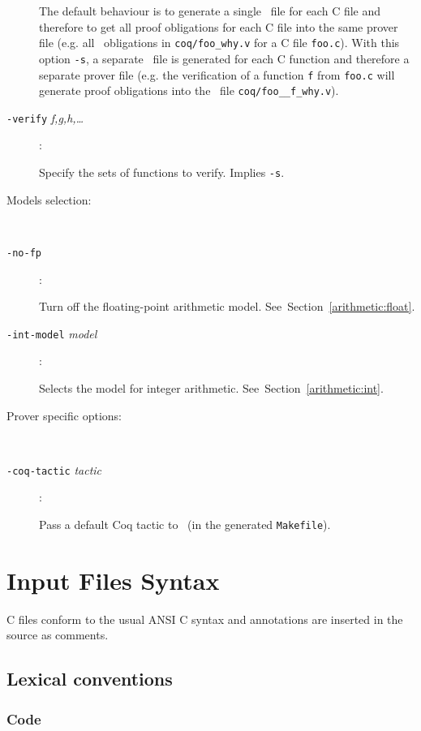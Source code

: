 \documentclass[12pt,a4paper,twoside,openright]{report}
\begin{document}
\begin{description}
    The default behaviour is to generate a single \why\ file 
    for each C file and therefore to get all proof obligations for
    each C file into the same prover file (e.g. all \coq\ obligations
    in \texttt{coq/foo\_why.v} for a C file \texttt{foo.c}).
    With this option \texttt{-s}, a separate \why\ file is generated
    for each C function and therefore a separate prover file
    (e.g. the verification of a function \texttt{f} from
    \texttt{foo.c} will generate proof obligations into the \coq\ file
    \texttt{coq/foo\_\_f\_why.v}).
  \item[\texttt{-verify} \textit{f,g,h,\dots}]: ~\par
    Specify the sets of functions to verify. Implies \texttt{-s}.

  \item[Models selection:] ~\par
  \item[\texttt{-no-fp}]: ~\par
    Turn off the floating-point arithmetic model. 
    See~Section~\ref{arithmetic:float}.

  \item[\texttt{-int-model} \textit{model}]: ~\par
    Selects the model for integer arithmetic.
    See~Section~\ref{arithmetic:int}.

  \item[Prover specific options:] ~\par
  \item[\texttt{-coq-tactic} \textit{tactic}]: ~\par
    Pass a default Coq tactic to \why\ (in the generated \texttt{Makefile}).

\end{description}

\section{Input Files Syntax}
\label{syntax}

C files conform to the usual ANSI C
syntax and annotations are inserted in the source as comments.

\subsection{Lexical conventions}
\label{lexical:c}

\subsubsection{Code}
\end{document}

